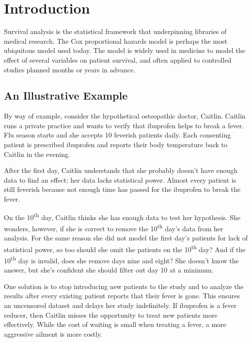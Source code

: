 \section{Introduction}

Survival analysis is the statistical framework that underpinning libraries of medical research. The Cox proportional hazards model \cite{cox} is perhaps the most ubiquitous model used today. The model is widely used in medicine to model the effect of several variables on patient survival, and often applied to controlled studies planned months or years in advance.

\subsection{An Illustrative Example}

By way of example, consider the hypothetical osteopathic doctor, Caitlin. Caitlin runs a private practice and wants to verify that ibuprofen helps to break a fever. Flu season starts and she accepts 10 feverish patients daily. Each consenting patient is prescribed ibuprofen and reports their body temperature back to Caitlin in the evening. 

After the first day, Caitlin understands that she probably doesn't have enough data to find an effect; her data lacks statistical power. Almost every patient is still feverish because not enough time has passed for the ibuprofen to break the fever. 

On the 10\textsuperscript{th} day, Caitlin thinks she has enough data to test her hypothesis. She wonders, however, if she is correct to remove the 10\textsuperscript{th} day's data from her analysis. For the same reason she did not model the first day's patients for lack of statistical power, so too should she omit the patients on the 10\textsuperscript{th} day? And if the 10\textsuperscript{th} day is invalid, does she remove days nine and eight? She doesn't know the answer, but she's confident she should filter out day 10 at a minimum. 

One solution is to stop introducing new patients to the study and to analyze the results after every existing patient reports that their fever is gone. This ensures an uncensored dataset and delays her study indefinitely. If ibuprofen is a fever reducer, then Caitlin misses the opportunity to treat new patients more effectively. While the cost of waiting is small when treating a fever, a more aggressive ailment is more costly. 

